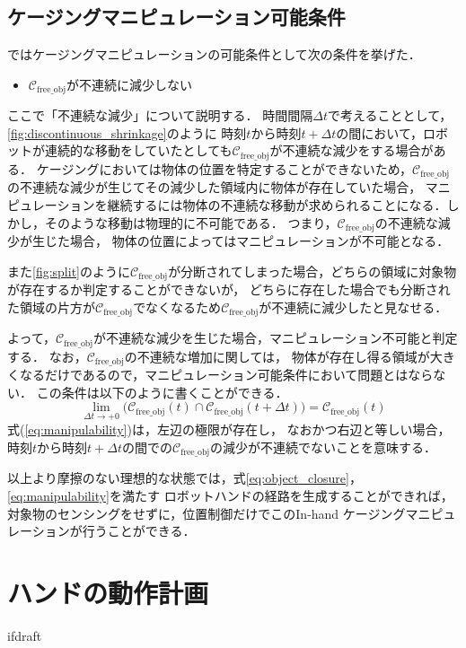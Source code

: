 \documentclass[a4paper,twoside,12pt,papersize, dvipdfmx]{iirthesis}
\begin{document}
\subsection*{ケージングマニピュレーション可能条件}
\cite{yokoi2010}ではケージングマニピュレーションの可能条件として次の条件を挙げた．
\begin{itemize}
\item $\mathcal{C}_{\mathrm{free\_obj}}$が不連続に減少しない
\end{itemize}

ここで「不連続な減少」について説明する．
時間間隔$\Delta t$で考えることとして，\figurename\ref{fig:discontinuous_shrinkage}のように
時刻$t$から時刻$t+\Delta t$の間において，ロボットが連続的な移動をしていたとしても$\mathcal{C}_{\mathrm{free\_obj}}$が不連続な減少をする場合がある．
ケージングにおいては物体の位置を特定することができないため，$\mathcal{C}_{\mathrm{free\_obj}}$の不連続な減少が生じてその減少した領域内に物体が存在していた場合，
マニピュレーションを継続するには物体の不連続な移動が求められることになる．しかし，そのような移動は物理的に不可能である．
つまり，$\mathcal{C}_{\mathrm{free\_obj}}$の不連続な減少が生じた場合，
物体の位置によってはマニピュレーションが不可能となる．


また\figurename\ref{fig:split}のように$\mathcal{C}_{\mathrm{free\_obj}}$が分断されてしまった場合，どちらの領域に対象物が存在するか判定することができないが，
どちらに存在した場合でも分断された領域の片方が$\mathcal{C}_{\mathrm{free\_obj}}$でなくなるため$\mathcal{C}_{\mathrm{free\_obj}}$が不連続に減少したと見なせる．

よって，$\mathcal{C}_{\mathrm{free\_obj}}$が不連続な減少を生じた場合，マニピュレーション不可能と判定する．
なお，$\mathcal{C}_{\mathrm{free\_obj}}$の不連続な増加に関しては，
物体が存在し得る領域が大きくなるだけであるので，マニピュレーション可能条件において問題とはならない．
この条件は以下のように書くことができる．
\begin{equation}
\lim_{\Delta t \rightarrow +0} \bigl( \mathcal{C}_{\mathrm{free\_obj}}(t) \cap \mathcal{C}_{\mathrm{free\_obj}}(t+\Delta t) \bigr)
= \mathcal{C}_{\mathrm{free\_obj}}(t)
\label{eq:manipulability}
\end{equation}
式(\ref{eq:manipulability})は，左辺の極限が存在し，
なおかつ右辺と等しい場合，
時刻$t$から時刻$t + \Delta t$の間での$\mathcal{C}_{\mathrm{free\_obj}}$の減少が不連続でないことを意味する．

以上より摩擦のない理想的な状態では，式\eqref{eq:object_closure}，\eqref{eq:manipulability}を満たす
ロボットハンドの経路を生成することができれば，対象物のセンシングをせずに，位置制御だけでこのIn-hand ケージングマニピュレーションが行うことができる．


\section{ハンドの動作計画}\label{sec::scim::planning}




\expandafter\ifx\csname ifdraft\endcsname\relax
    
\end{document}
